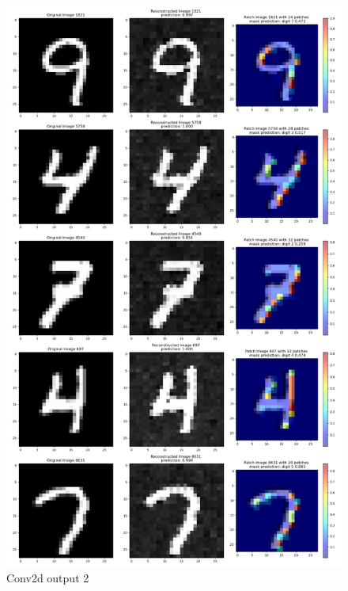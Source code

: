 \documentclass[12pt]{article}
\begin{document}
\begin{figure}[H]
    \centering
    \includegraphics[width=0.8\linewidth]{../fig-mask-collection/ID_8631_Original_Reconstructed_Patch_1.png} %
    \caption{Conv2d output 2}
    \label{fig:exp2}
\end{figure}
\end{document}
